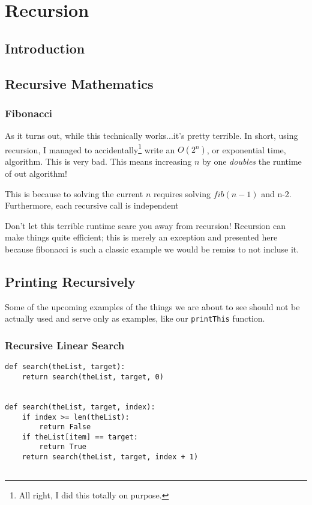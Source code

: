 \chapter{Recursion}

\section{Introduction}

\section{Recursive Mathematics}

\subsection{Fibonacci}
As it turns out, while this technically works...it's pretty terrible.  In short, using recursion, I managed to accidentally\footnote{All right, I did this totally on purpose.} write an $ O(2^n) $, or exponential time,  algorithm.  This is very bad.  This means increasing $ n $ by one \emph{doubles} the runtime of out algorithm!

This is because to solving the current $n$ requires solving $fib(n-1)$ and n-2.  Furthermore, each recursive call is independent



Don't let this terrible runtime scare you away from recursion!  Recursion can make things quite efficient; this is merely an exception and presented here because fibonacci is such a classic example we would be remiss to not incluse it.


\section{Printing Recursively}
Some of the upcoming examples  of the things we are about to see should not be actually  used and serve only as examples, like our \texttt{printThis} function.


\subsection{Recursive Linear Search}




\begin{verbatim}
def search(theList, target):
	return search(theList, target, 0)


def search(theList, target, index):
	if index >= len(theList):
		return False 
	if theList[item] == target:
		return True
	return search(theList, target, index + 1)
	
\end{verbatim}


